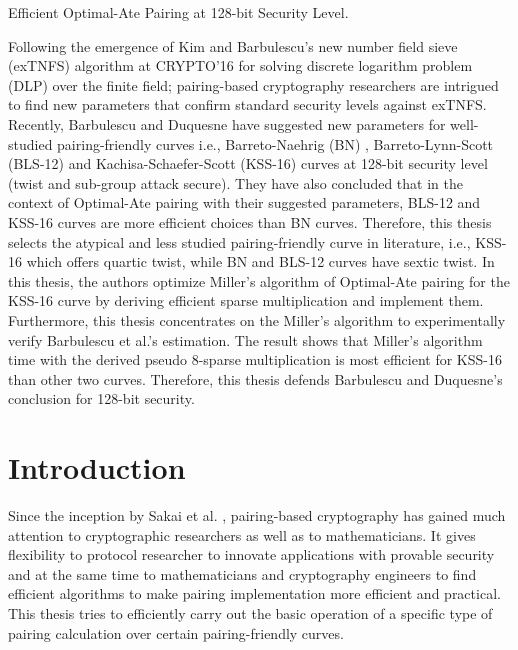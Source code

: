Efficient Optimal-Ate Pairing at 128-bit Security Level.

Following the emergence of Kim and Barbulescu's new number field sieve (exTNFS) algorithm at CRYPTO'16 \cite{C:KimBar16} for solving discrete logarithm problem (DLP) over the finite field; pairing-based cryptography researchers are intrigued to find new parameters that confirm standard security levels against exTNFS. 
Recently, Barbulescu and Duquesne have suggested new parameters \cite{sylvain_new_param} for well-studied pairing-friendly curves i.e., Barreto-Naehrig (BN) \cite{SAC:BarNae05}, Barreto-Lynn-Scott (BLS-12) \cite{SCN:BarLynSco02} and Kachisa-Schaefer-Scott (KSS-16) \cite{EPRINT:KacSchSco07} curves at 128-bit security level (twist and sub-group attack secure). 
They have also concluded that in the context of Optimal-Ate pairing with their suggested parameters, BLS-12 and KSS-16 curves are more efficient choices than BN curves. 
Therefore, this thesis selects the atypical and less studied pairing-friendly curve in literature, i.e., KSS-16 which offers quartic twist, while BN and BLS-12 curves have sextic twist.
In this thesis, the authors optimize Miller's algorithm of Optimal-Ate pairing for the KSS-16 curve by deriving efficient sparse multiplication and implement them.
Furthermore, this thesis concentrates on the Miller's algorithm to experimentally verify Barbulescu et al.'s estimation.
The result shows that Miller's algorithm time with the derived pseudo 8-sparse multiplication is most efficient for KSS-16 than other two curves.
Therefore, this thesis defends Barbulescu and Duquesne's conclusion for 128-bit security.


\section{Introduction}
Since the inception by Sakai et al. \cite{sakai2000cryptosystems}, pairing-based cryptography has gained much attention to cryptographic researchers as well as  to mathematicians. It gives flexibility to protocol researcher to innovate applications with provable security and at the same time to mathematicians and cryptography engineers to find efficient algorithms to make pairing implementation more efficient and practical.
This thesis tries to efficiently carry out the basic operation of a specific type of pairing calculation over certain pairing-friendly curves. 

